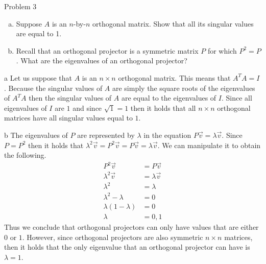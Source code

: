\begin{section}{Problem 3}
    \begin{problem}{3}
        \begin{enumerate}[(a)]
            \item Suppose $A$ is an $n$-by-$n$ orthogonal matrix. Show that all its singular values are equal to 1.
            \item Recall that an orthogonal projector is a symmetric matrix $P$ for which $P^2=P$. What are the eigenvalues of an orthogonal projector?
        \end{enumerate}
    \end{problem}

    \begin{solution}{a}
        Let us suppose that $A$ is an $n \times n$ orthogonal matrix. This means that $A^T A = I$. Because the singular values of $A$ are simply the square roots of the eigenvalues of $A^T A$ then the singular values of $A$ are equal to the eigenvalues of $I$. Since all eigenvalues of $I$ are $1$ and since $\sqrt{1} = 1$ then it holds that all $n \times n$ orthogonal matrices have all singular values equal to $1$.
    \end{solution}
    
    \begin{solution}{b}
        The eigenvalues of $P$ are represented by $\lambda$ in the equation $P \vec{v} = \lambda \vec{v}$. Since $P = P^2$ then it holds that $\lambda^2 \vec{v} = P^2 \vec{v} = P \vec{v} = \lambda \vec{v}$. We can manipulate it to obtain the following.
        \begin{align*}
            P^2 \vec{v} &= P \vec{v} \\
            \lambda^2 \vec{v} &= \lambda \vec{v} \\
            \lambda^2 &= \lambda \\
            \lambda^2 - \lambda &= 0 \\
            \lambda (1 - \lambda) &= 0 \\
            \lambda &= 0, 1
        \end{align*}
        Thus we conclude that orthogonal projectors can only have values that are either $0$ or $1$. However, since orthogonal projectors are also symmetric $n \times n$ matrices, then it holds that the only eigenvalue that an orthogonal projector can have is $\lambda = 1$.
    \end{solution}
\end{section}